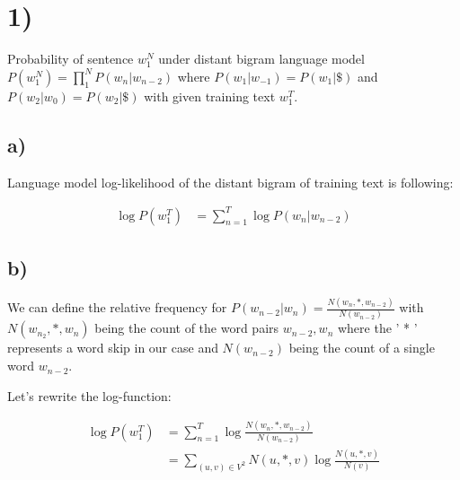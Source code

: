 \section*{1)} %
\label{sec:1_}
Probability of sentence $w_{1}^{N}$ under distant bigram language model $P(w_{1}^{N}) = \displaystyle\prod_{1}^{N}P(w_{n}|w_{n-2})$ where $P(w_{1}|w_{-1}) = P(w_{1}|\$)$ and $P(w_{2}|w_{0}) = P(w_{2}|\$)$ with given training text $w_{1}^{T}$. 
\subsection*{a)} %
\label{sub:a_}
Language model log-likelihood of the distant bigram of training text is following:  

\begin{align*}
    \log P(w_{1}^{T}) &= \sum\limits_{n=1}^{T}\log  P(w_{n}|w_{n-2}) 
\end{align*}


\subsection*{b)} %
\label{sub:b_}

We can define the relative frequency for $P(w_{n-2}|w_n) = \frac{N(w_{n}, * ,w_{n-2})}{N(w_{n-2})}$
with $N(w_{n_2}, * ,w_n)$ being the count of the word pairs $w_{n-2}, w_n$ where the ' * ' represents a word skip in our case 
and $N(w_{n-2})$ being the count of a single word $w_{n-2}$.

Let's rewrite the log-function: 

\begin{align*}
    \log P(w_{1}^{T}) &= \sum\limits_{n=1}^{T}\log \frac{N(w_{n}, * ,w_{n-2})}{N(w_{n-2})} \\
    				  &= \sum_{(u,v) \in V^2} N(u, * ,v) \log \frac{N(u, * ,v)}{N(v)} \\
\end{align*}


